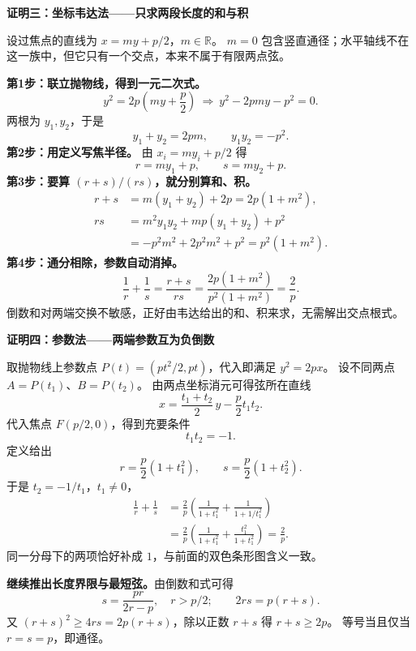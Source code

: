 \clearpage
\begin{proofbox}
\textbf{\textcolor{CProof}{证明三：坐标韦达法——只求两段长度的和与积}}

设过焦点的直线为 $x=my+p/2$，$m\in\mathbb R$。
$m=0$ 包含竖直通径；水平轴线不在这一族中，但它只有一个交点，本来不属于有限两点弦。

\par\medskip
\textbf{第1步：联立抛物线，得到一元二次式。}
\[
 y^2=2p\left(my+\frac p2\right)
 \ \Longrightarrow\ y^2-2pmy-p^2=0.
\]
两根为 $y_1,y_2$，于是
\[
 y_1+y_2=2pm,\qquad y_1y_2=-p^2.
\]
\textbf{第2步：用定义写焦半径。}
由 $x_i=my_i+p/2$ 得
\[
 r=my_1+p,\qquad s=my_2+p.
\]
\textbf{第3步：要算 $(r+s)/(rs)$，就分别算和、积。}
\[
\begin{aligned}
 r+s&=m(y_1+y_2)+2p=2p(1+m^2),\\
 rs&=m^2y_1y_2+mp(y_1+y_2)+p^2\\
   &=-p^2m^2+2p^2m^2+p^2=p^2(1+m^2).
\end{aligned}
\]
\textbf{第4步：通分相除，参数自动消掉。}
\[
 \frac1r+\frac1s=\frac{r+s}{rs}
 =\frac{2p(1+m^2)}{p^2(1+m^2)}=\boxed{\frac2p}.
\]
倒数和对两端交换不敏感，正好由韦达给出的和、积来求，无需解出交点根式。
\end{proofbox}

\clearpage
\begin{proofbox}
\textbf{\textcolor{CProof}{证明四：参数法——两端参数互为负倒数}}

取抛物线上参数点 $P(t)=(pt^2/2,pt)$，代入即满足 $y^2=2px$。
设不同两点 $A=P(t_1)$、$B=P(t_2)$。
由两点坐标消元可得弦所在直线
\[
 x=\frac{t_1+t_2}{2}\,y-\frac p2t_1t_2.
\]
代入焦点 $F(p/2,0)$，得到充要条件
\[
 \boxed{t_1t_2=-1}.
\]
定义给出
\[
 r=\frac p2(1+t_1^2),\qquad s=\frac p2(1+t_2^2).
\]
于是 $t_2=-1/t_1$，$t_1\ne0$，
\[
\begin{aligned}
 \frac1r+\frac1s
 &=\frac2p\left(\frac1{1+t_1^2}+\frac1{1+1/t_1^2}\right)\\
 &=\frac2p\left(\frac1{1+t_1^2}+\frac{t_1^2}{1+t_1^2}\right)
 =\boxed{\frac2p}.
\end{aligned}
\]
同一分母下的两项恰好补成 $1$，与前面的双色条形图含义一致。

\par\medskip
\textbf{继续推出长度界限与最短弦。}由倒数和式可得
\[
 s=\frac{pr}{2r-p},\quad r>p/2;
 \qquad 2rs=p(r+s).
\]
又 $(r+s)^2\ge4rs=2p(r+s)$，除以正数 $r+s$ 得 $r+s\ge2p$。
等号当且仅当 $r=s=p$，即通径。
\end{proofbox}
